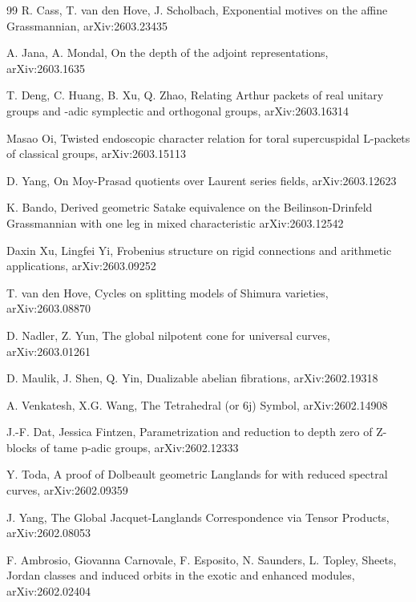 \documentclass[a4paper]{jpconf}
\begin{document}
\begin{thebibliography}{99}
 R. Cass, T. van den Hove, J. Scholbach,
Exponential motives on the affine Grassmannian,
arXiv:2603.23435


 A. Jana, A. Mondal,
On the depth of the adjoint representations,
arXiv:2603.1635

 T. Deng, C.  Huang, B. Xu, Q. Zhao,
Relating Arthur packets of real unitary groups and -adic symplectic and orthogonal groups,
arXiv:2603.16314





 Masao Oi,
Twisted endoscopic character relation for toral supercuspidal L-packets of classical groups,
arXiv:2603.15113


 D. Yang,
On Moy-Prasad quotients over Laurent series fields,
arXiv:2603.12623


K. Bando,
Derived geometric Satake equivalence on the Beilinson-Drinfeld Grassmannian with one leg in mixed characteristic
arXiv:2603.12542



 Daxin Xu, Lingfei Yi,
Frobenius structure on rigid connections and arithmetic applications,
arXiv:2603.09252


 T. van den Hove,
Cycles on splitting models of Shimura varieties,
arXiv:2603.08870


 D. Nadler, Z. Yun,
The global nilpotent cone for universal curves,
arXiv:2603.01261



  D. Maulik, J. Shen, Q. Yin,
Dualizable abelian fibrations,
arXiv:2602.19318



 A. Venkatesh, X.G. Wang,
The Tetrahedral (or 6j) Symbol,
arXiv:2602.14908


 J.-F. Dat, Jessica Fintzen,
Parametrization and reduction to depth zero of Z-blocks of tame p-adic groups,
arXiv:2602.12333


 Y. Toda,
A proof of Dolbeault geometric Langlands for  with reduced spectral curves,
arXiv:2602.09359




 J. Yang,
The Global Jacquet-Langlands Correspondence via Tensor Products,
arXiv:2602.08053





  F. Ambrosio, Giovanna Carnovale, F. Esposito, N. Saunders, L. Topley,
  Sheets, Jordan classes and induced orbits in the exotic and enhanced modules,
arXiv:2602.02404



\end{thebibliography}
\end{document}
